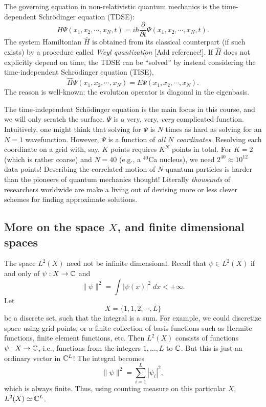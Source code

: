 \documentclass{report}
\theoremstyle{plain}
\theoremstyle{definition}
\begin{document}
The governing equation in non-relativistic quantum mechanics is the
time-dependent Schr\"odinger equation (TDSE):
\begin{equation}
  \hat{H} \Psi(x_1,x_2,\cdots,x_N,t) = i \hbar \frac{\partial}{\partial t} \Psi(x_1,x_2,\cdots,x_N,t).
\end{equation}
The system Hamiltonian $\hat{H}$ is obtained from its classical
counterpart (if such exists) by a procedure called \emph{Weyl
  quantization} [Add reference!]. If $\hat{H}$ does not explicitly depend on time, the
TDSE can be ``solved'' by instead considering the time-independent
Schr\"odinger equation (TISE),
\begin{equation}
  \hat{H} \Psi(x_1,x_2,\cdots,x_N) = E \Psi(x_1,x_2,\cdots,x_N). \label{eq:TISE}
\end{equation}
The reason is well-known: the evolution operator is diagonal in the
eigenbasis.

The time-independent Sch\"odinger equation is the main focus in this
course, and we will only scratch the surface. $\Psi$ is a very, very,
\emph{very} complicated function. Intuitively, one might think that
solving for $\Psi$ is $N$ times as hard as solving for an $N=1$
wavefunction. However, $\Psi$ is a function of \emph{all $N$
  coordinates}. Resolving each coordinate on a grid with, say, $K$
points requires $K^N$ points in total. For $K=2$ (which is rather
coarse) and $N=40$ (e.g., a ${}^{40}$Ca nucleus), we need $2^{40}
\approx 10^{12}$ data points! Describing the correlated motion of $N$
quantum particles is harder than the pioneers of quantum mechanics thought! Literally
\emph{thousands} of researchers worldwide are make a living out of
devising more or less clever schemes for finding approximate
solutions.


\subsection{More on the space $X$, and finite dimensional spaces}


The space $L^2(X)$ need not be infinite dimensional. Recall that
$\psi \in L^2(X)$ if and only of $\psi : X \to \mathbb{C}$ and 
\[ \|\psi\|^2 = \int |\psi(x)|^2 \; dx < +\infty. \]
Let
\[ X = \{ 1, 1, 2, \cdots, L \} \]
be a discrete set, such that the integral is a sum. For example, we
could discretize space using grid points, or a finite collection of
basis functions such as Hermite functions, finite element functions,
etc. Then  $L^2(X)$ consists of functions $\psi : X \to \mathbb{C}$, i.e.,
functions from the integers $1,\ldots,L$ to $\mathbb{C}$. But this is just
an ordinary vector in $\mathbb{C}^L$! The integral becomes
\[ \|\psi\|^2 = \sum_{i=1}^L |\psi_i|^2, \] which is always finite.
Thus, using counting measure on this particular $X$, $L^2(X) \simeq \mathbb{C}^L$.
\end{document}
